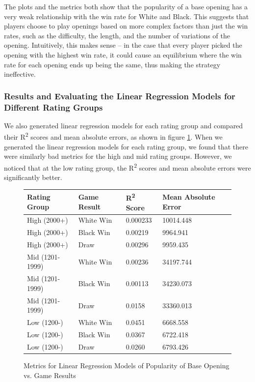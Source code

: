 \documentclass[a4paper, 11pt]{article}
\begin{document}
The plots and the metrics both show that the popularity of a base opening has a very weak relationship with the win rate for White and Black. This suggests that players choose to play openings based on more complex factors than just the win rates, such as the difficulty, the length, and the number of variations of the opening. Intuitively, this makes sense -- in the case that every player picked the opening with the highest win rate, it could cause an equilibrium where the win rate for each opening ends up being the same, thus making the strategy ineffective.

\subsubsection{Results and Evaluating the Linear Regression Models for Different Rating Groups}
We also generated linear regression models for each rating group and compared their R\textsuperscript{2} scores and mean absolute errors, as shown in figure \ref{fig:metricsForLinearRegressionModelsOfPopularityOfBaseOpeningVsGameResults}. When we generated the linear regression models for each rating group, we found that there were similarly bad metrics for the high and mid rating groups. However, we noticed that at the low rating group, the R\textsuperscript{2} scores and mean absolute errors were significantly better.

\begin{figure}[H]
    \centering
    \caption{Metrics for Linear Regression Models of Popularity of Base Opening vs. Game Results}
    \label{fig:metricsForLinearRegressionModelsOfPopularityOfBaseOpeningVsGameResults}
    \begin{tabular}{| l | l | l | l |} 
        \hline
        \bf{Rating Group} & \bf{Game Result} & \bf{R\textsuperscript{2} Score} & \bf{Mean Absolute Error} \\ [0.5ex] 
        \hline
        High (2000+) & White Win & 0.000233 & 10014.448 \\
        \hline
        High (2000+) & Black Win & 0.00219 & 9964.941 \\
        \hline
        High (2000+) & Draw & 0.00296 & 9959.435 \\
        \hline
        Mid (1201-1999) & White Win & 0.00236 & 34197.744 \\
        \hline
        Mid (1201-1999) & Black Win & 0.00113 & 34230.073 \\
        \hline
        Mid (1201-1999) & Draw & 0.0158 & 33360.013 \\
        \hline
        Low (1200-) & White Win & 0.0451 & 6668.558 \\
        \hline
        Low (1200-) & Black Win & 0.0367 & 6722.418 \\
        \hline
        Low (1200-) & Draw & 0.0260 & 6793.426 \\
        \hline
    \end{tabular}
\end{figure}
\end{document}
